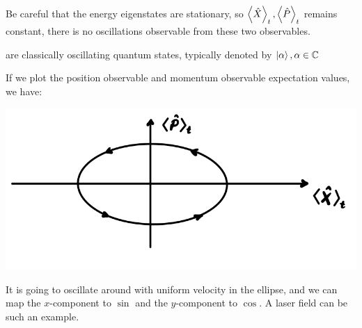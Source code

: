 Be careful that the energy eigenstates are stationary, so $\expval{\hat{X}}_t, \expval{\hat{P}}_t$ remains constant, there is no oscillations observable from these two observables.
\begin{definition}
     are classically oscillating quantum states, typically denoted by $\ket{\alpha}, \alpha \in \mathbb{C}$
\end{definition}
If we plot the position observable and momentum observable expectation values, we have:
\begin{center}
    \includegraphics[scale = 1]{coherent-state.png}
\end{center}
It is going to oscillate around with uniform velocity in the ellipse, and we can map the $x$-component to $\sin$ and the $y$-component to $\cos$. A laser field can be such an example.

\newpage